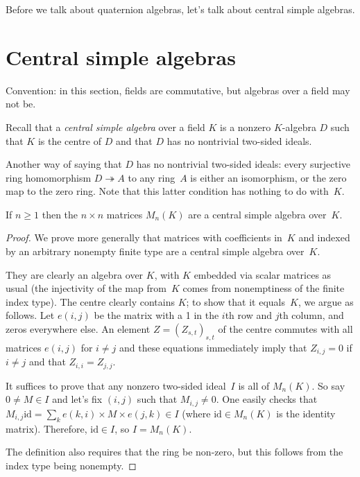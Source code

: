 Before we talk about quaternion algebras, let's talk about central simple algebras.

\section{Central simple algebras}

Convention: in this section, fields are commutative, but algebras over a field may not be.

Recall that a \emph{central simple algebra} over a field $K$ is a
nonzero $K$-algebra $D$ such that $K$ is the
centre of $D$ and that $D$ has no nontrivial two-sided ideals.

Another way of saying that $D$ has no nontrivial two-sided ideals: every surjective ring
homomorphism $D\twoheadrightarrow A$ to any ring~$A$ is either an isomorphism, or the zero map
to the zero ring. Note that this latter condition
has nothing to do with~$K$.

\begin{lemma}
    \label{MatrixRing.isCentralSimple}
    \leanok
    If $n\geq1$ then the $n\times n$ matrices $M_n(K)$ are a central simple algebra over~$K$.
\end{lemma}
\begin{proof}\leanok
We prove more generally that matrices with coefficients in~$K$ and indexed by an arbitrary nonempty
finite type are a central simple algebra over~$K$.

They are clearly an algebra over $K$, with $K$ embedded via scalar matrices as usual
(the injectivity of the map from~$K$ comes from nonemptiness of the finite index type).
The centre clearly contains $K$; to show that it
equals~$K$, we argue as follows. Let $e(i,j)$ be the matrix with a 1 in the $i$th row and $j$th
column, and zeros everywhere else. An element $Z=(Z_{s,t})_{s,t}$ of the centre commutes with
all matrices $e(i,j)$ for $i\not=j$ and these equations immediately imply that $Z_{i,j}=0$ if
$i\not=j$ and that $Z_{i,i}=Z_{j,j}$.

It suffices to prove that any nonzero two-sided ideal~$I$ is all of $M_n(K)$. So say $0\not=M\in I$
and let's fix $(i,j)$ such that $M_{i,j}\not=0$. One easily checks that
$M_{i,j} \mathrm{id} = \sum_{k}e(k,i)\times M\times e(j,k)\in I$ (where $\mathrm{id} \in M_n(K)$
is the identity matrix). Therefore, $\mathrm{id} \in I$, so $I = M_n(K)$.

The definition also requires that the ring be non-zero, but this follows from the index type being
nonempty.
\end{proof}

